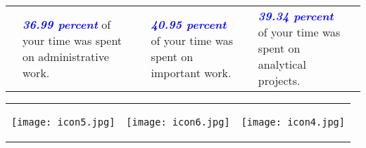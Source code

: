 \documentclass[a4paper]{article}
\begin{document}
\begin{table}[h!]
     \begin{center}
     \begin{tabular}{m{0.5cm} m{4cm} m{0.5cm} m{4cm} m{0.5cm} m{4cm} m{0.5cm}}
    \begin {minipage} {0.5cm}
     \end{minipage}
      &
     \begin {minipage} {4cm}
     \Large{\textbf{\textcolor{blue}{\emph{36.99 percent}}} of your time was spent on administrative work.}
     \end{minipage}
      &
      \begin {minipage} {0.5cm}
     \end{minipage}
      &
     \begin {minipage} {4cm}
     \Large{\textbf{\textcolor{blue}{\emph{40.95 percent}}} of your time was spent on important work.}
     \end{minipage}
     &
    \begin {minipage} {0.5cm}
     \end{minipage}
      &
     \begin {minipage} {4cm}
     \Large{\textbf{\textcolor{blue}{\emph{39.34 percent}}} of your time was spent on analytical projects.}
     \end{minipage}
     &
    \begin {minipage} {0.5cm}
     \end{minipage}
      \end{tabular}
      \end{center}
      \end{table}

\begin{table}[h!]
     \begin{center}
     \begin{tabular}{m{5cm} m{5cm} m{5cm}}
     \begin {minipage} {5cm}
          \begin{center}
     \texttt{[image: icon5.jpg]}
          \end{center}
     \end{minipage}
      &
     \begin {minipage} {5cm}
          \begin{center}
     \texttt{[image: icon6.jpg]}
          \end{center}
     \end{minipage}
     &
     \begin {minipage} {5cm}
          \begin{center}
     \texttt{[image: icon4.jpg]}
          \end{center}
     \end{minipage}
      \end{tabular}
      \end{center}
      \end{table}
\end{document}
